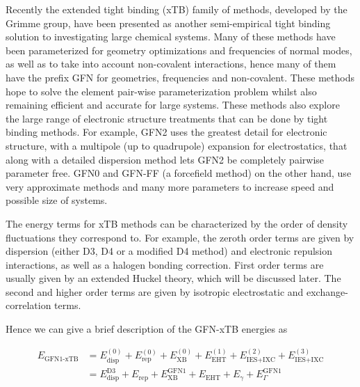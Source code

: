 Recently the extended tight binding (xTB) family of methods, developed by the Grimme 
group, have been presented as another semi-empirical tight binding solution to investigating 
large chemical systems\cite{Bannwarth2020}\cite{Bannwarth2019}\cite{Grimme2017}\cite{Pracht2019}\cite{Grimme2016}\cite{Spicher2020a}.
Many of these methods have been parameterized for geometry optimizations and frequencies 
of normal modes, as well as to take into account non-covalent interactions, hence 
many of them have the prefix GFN for geometries, frequencies and non-covalent. These 
methods hope to solve the element pair-wise parameterization problem whilst also 
remaining efficient and accurate for large systems. These methods also explore the 
large range of electronic structure treatments that can be done by tight binding 
methods. For example, GFN2 uses the greatest detail for electronic structure, with 
a multipole (up to quadrupole) expansion for electrostatics, that along with a detailed 
dispersion method lets GFN2 be completely pairwise parameter free. GFN0 and GFN-FF (a forcefield method) on the other hand, use very approximate methods and many more parameters to increase speed and possible size of systems.

The energy terms for xTB methods can be characterized by the order of density fluctuations 
they correspond to. For example, the zeroth order terms are given by dispersion 
(either D3\cite{Grimme2010}, D4\cite{Caldeweyher2020} or a modified D4 method) and
electronic repulsion interactions, as well as a halogen bonding correction. First 
order terms are usually given by an extended Huckel theory, which will be discussed 
later. The second and higher order terms are given by isotropic electrostatic and 
exchange-correlation terms.

Hence we can give a brief description of the GFN-xTB energies as

\newcommand{\orderE}[2]{E^{\left(#1\right)}_{#2}}
\newcommand{\nameE}[2]{E^{#1}_{#2}}
\begin{equation}
\begin{aligned}
E_{\text{GFN1-xTB}} &= \orderE{0}{\text{disp}} + \orderE{0}{\text{rep}} + \orderE{0}{\text{XB}} + \orderE{1}{\text{EHT}} + \orderE{2}{\text{IES+IXC}} + \orderE{3}{\text{IES+IXC}} \\
&= \nameE{\text{D3}}{\text{disp}} + \nameE{}{\text{rep}} + \nameE{\text{GFN1}}{\text{XB}} + \nameE{}{\text{EHT}} + \nameE{}{\gamma} + \nameE{\text{GFN1}}{\Gamma}
\end{aligned}
\end{equation}


